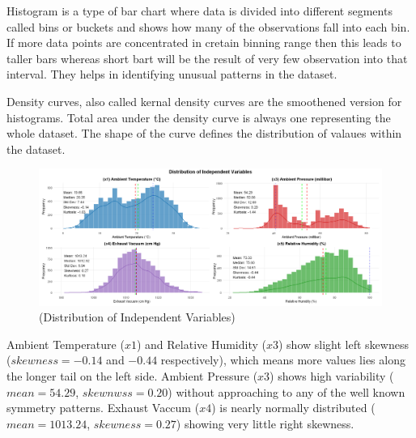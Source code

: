 \documentclass[12pt,a4paper]{article}
\begin{document}
Histogram is a type of bar chart where data is divided into different segments called bins or buckets
and shows how many of the observations fall into each bin. If more data points are concentrated
in cretain binning range then this leads to taller bars whereas short bart will be the result of
very few observation into that interval. They helps in identifying unusual patterns in the dataset. 

Density curves, also called kernal density curves are the smoothened version for histograms.
Total area under the density curve is always one representing the whole dataset. The shape
of the curve defines the distribution of valaues within the dataset. 

\begin{figure}[H]
  \centering
  \includegraphics[width=\textwidth]{z6.png}
  \caption{(Distribution of Independent Variables)}
  \label{fig:Distribution of Independent Variables}
\end{figure}


Ambient Temperature ($x1$) and Relative Humidity ($x3$) show 
slight left skewness ($skewness= -0.14$ and $-0.44$ respectively), which means more values lies along the longer 
tail on the left side. Ambient Pressure ($x3$) shows high variability ($mean= 54.29$, $skewnwss= 0.20$) without approaching to any of the well known
symmetry patterns. Exhaust Vaccum ($x4$) is nearly normally distributed ($mean= 1013.24$, $skewness= 0.27$) showing very little right skewness. 
\end{document}
